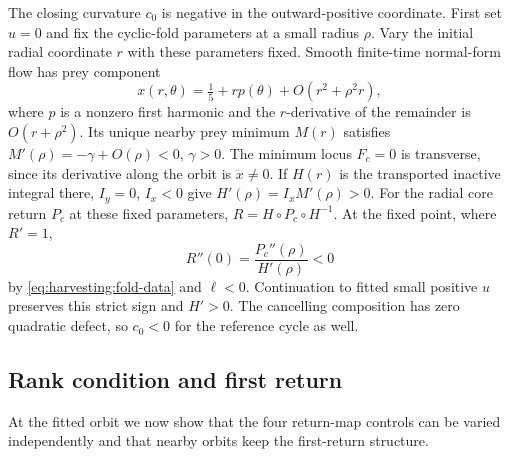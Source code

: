 The closing curvature \(c_0\) is negative in the outward-positive coordinate. First
set \(u=0\) and fix the cyclic-fold parameters at a small radius
\(\rho\). Vary the initial radial coordinate \(r\) with these
parameters fixed. Smooth finite-time normal-form flow has prey component
\[
 x(r,\theta)=\tfrac15+rp(\theta)+O(r^2+\rho^2r),
\]
where \(p\) is a nonzero first harmonic and the \(r\)-derivative
of the remainder is \(O(r+\rho^2)\). Its unique nearby prey minimum
\(M(r)\) satisfies \(M'(\rho)=-\gamma+O(\rho)<0\), \(\gamma>0\).
The minimum locus \(F_c=0\) is transverse, since its derivative
along the orbit is \(\ddot x\ne0\). If \(H(r)\) is the
transported inactive integral there, \(I_y=0\), \(I_x<0\) give
\(H'(\rho)=I_xM'(\rho)>0\). For the radial core return \(P_c\)
at these fixed parameters,
\(R=H\circ P_c\circ H^{-1}\). At the fixed point, where \(R'=1\),
\[
 R''(0)=\frac{P_c''(\rho)}{H'(\rho)}<0
\]
by \eqref{eq:harvesting:fold-data} and \(\ell<0\).
Continuation to fitted small positive \(u\) preserves this strict
sign and \(H'>0\). The cancelling composition has zero quadratic
defect, so \(c_0<0\) for the reference cycle as well.

\subsection{Rank condition and first return}

At the fitted orbit we now show that the four return-map controls can be
varied independently and that nearby orbits keep the first-return structure.


